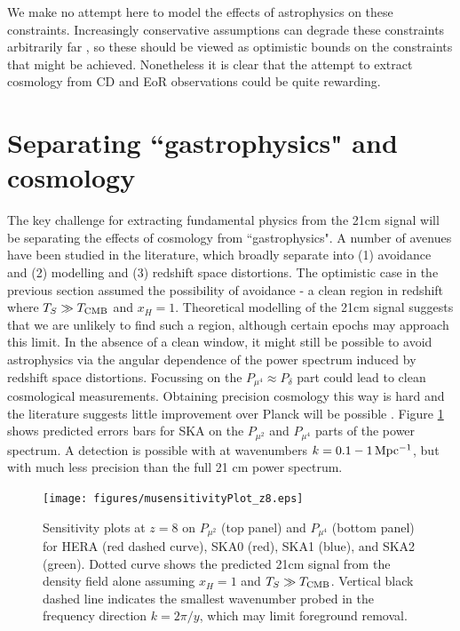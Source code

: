 \documentclass{PoS}
\begin{document}
We make no attempt here to model the effects of astrophysics on these constraints. Increasingly conservative assumptions can degrade these constraints arbitrarily far \citep{2008PhRvD..78b3529M}, so these should be viewed as optimistic bounds on the constraints that might be achieved. Nonetheless it is clear that the attempt to extract cosmology from CD and EoR observations could be quite rewarding. 


\section{Separating ``gastrophysics" and cosmology}
\label{sec:separation}

The key challenge for extracting fundamental physics from the 21cm signal will be separating the effects of cosmology from ``gastrophysics". A number of avenues have been studied in the literature, which broadly separate into (1) avoidance and (2) modelling and (3) redshift space distortions. The optimistic case in the previous section assumed the possibility of avoidance - a clean region in redshift where $T_S\gg T_{\rm CMB}$ and $x_H=1$. Theoretical modelling of the 21cm signal \citep[e.g.][]{2008PhRvD..78j3511P,2011MNRAS.410.1377T,2013MNRAS.431..621M,2014MNRAS.437L..36F} suggests that we are unlikely to find such a region, although certain epochs may approach this limit. In the absence of a clean window, it might still be possible to avoid astrophysics via the angular dependence of the power spectrum induced by redshift space distortions. Focussing on the $P_{\mu^4}\approx P_\delta$ part could lead to clean cosmological measurements. Obtaining precision cosmology this way is hard and the literature suggests little improvement over Planck will be possible \citep{2006ApJ...653..815M,2008PhRvD..78b3529M}. Figure \ref{fig:musensitivity} shows predicted errors bars for SKA on the $P_{\mu^2}$ and $P_{\mu^4}$ parts of the power spectrum. A detection is possible with at wavenumbers $k=0.1-1{\rm\,Mpc^{-1}}$, but with much less precision than the full 21 cm power spectrum. 

\begin{figure}[htbp]
\begin{center}
\texttt{[image: figures/musensitivityPlot\_z8.eps]}
\caption{Sensitivity plots at $z=8$ on $P_{\mu^2}$ (top panel) and $P_{\mu^4}$ (bottom panel) for HERA (red dashed curve), SKA0 (red), SKA1 (blue), and SKA2 (green). Dotted curve shows the predicted 21cm signal from the density field alone assuming $x_H=1$ and $T_S\gg T_{\rm CMB}$. Vertical black dashed line indicates the smallest wavenumber probed in the frequency direction $k=2\pi/y$, which may limit foreground removal. }
\label{fig:musensitivity}
\end{center}
\end{figure}
\end{document}
